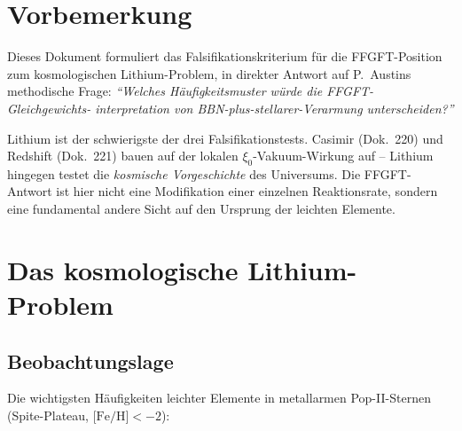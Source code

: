 
\section*{Vorbemerkung}

Dieses Dokument formuliert das Falsifikationskriterium für die
FFGFT-Position zum kosmologischen Lithium-Problem, in direkter
Antwort auf P.~Austins methodische Frage:
\emph{\enquote{Welches Häufigkeitsmuster würde die FFGFT-Gleichgewichts-\linebreak
interpretation von BBN-plus-stellarer-Verarmung unterscheiden?}}

Lithium ist der schwierigste der drei Falsifikationstests. Casimir
(Dok.~220) und Redshift (Dok.~221) bauen auf der lokalen
$\xi_0$-Vakuum-Wirkung auf -- Lithium hingegen testet die
\emph{kosmische Vorgeschichte} des Universums. Die FFGFT-Antwort
ist hier nicht eine Modifikation einer einzelnen Reaktionsrate,
sondern eine fundamental andere Sicht auf den Ursprung der
leichten Elemente.

\section{Das kosmologische Lithium-Problem}

\subsection{Beobachtungslage}

Die wichtigsten Häufigkeiten leichter Elemente in metallarmen
Pop-II-Sternen (Spite-Plateau, $\text{[Fe/H]} < -2$):

